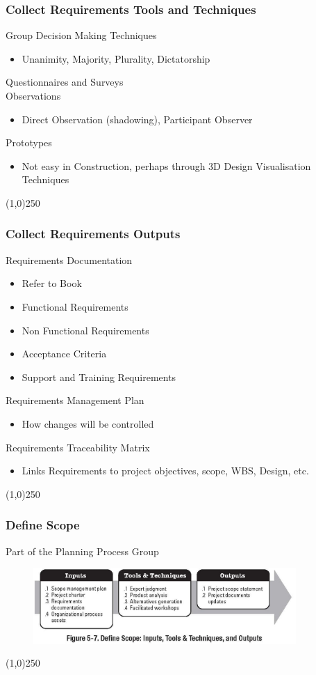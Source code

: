 \begin{frame}
\frametitle{Collect Requirements \hfill Tools and Techniques}
Group Decision Making Techniques
\begin{itemize}
	\item Unanimity, Majority, Plurality, Dictatorship
\end{itemize}
Questionnaires and Surveys\\
Observations
\begin{itemize}
	\item Direct Observation (shadowing), Participant Observer
\end{itemize}
Prototypes
\begin{itemize}
	\item Not easy in Construction, perhaps through 3D Design Visualisation Techniques
\end{itemize}
\end{frame}\begin{center}\line(1,0){250}\end{center}



\begin{frame}
\frametitle{Collect Requirements \hfill Outputs}
Requirements Documentation
\begin{itemize}
	\item Refer to Book
	\item Functional Requirements
	\item Non Functional Requirements
	\item Acceptance Criteria
	\item Support and Training Requirements
\end{itemize}
Requirements Management Plan
\begin{itemize}
	\item How changes will be controlled
\end{itemize}
Requirements Traceability Matrix
\begin{itemize}
	\item Links Requirements to project objectives, scope, WBS, Design, etc.
\end{itemize}
\end{frame}\begin{center}\line(1,0){250}\end{center}



\begin{frame}
\frametitle{Define Scope}{Part of the Planning Process Group}
\begin{figure}
	\centering
		\includegraphics[width = 10cm]{images/Fig5-7.jpg}
	\label{fig:5-7}
\end{figure}
\end{frame}\begin{center}\line(1,0){250}\end{center}



